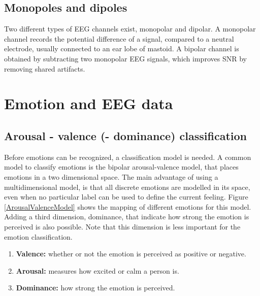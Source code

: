 
\subsection{Monopoles and dipoles}
Two different types of EEG channels exist, monopolar and dipolar. A monopolar channel records the potential difference of a signal, compared to a neutral electrode, usually connected to an ear lobe of mastoid. A bipolar channel is obtained by subtracting two monopolar EEG signals, which improves SNR by removing shared artifacts\cite{MonoBiPolar}. 

\section{Emotion and EEG data}

\subsection{Arousal - valence (- dominance) classification}
Before emotions can be recognized, a classification model is needed. A common model to classify emotions is the bipolar arousal-valence model\cite{ExtendedPaper}\cite{RealTimeEEGEmotion}, that places emotions in a two dimensional space. The main advantage of using a multidimensional model, is that all discrete emotions are modelled in its space, even when no particular label can be used to define the current feeling. Figure \ref{ArousalValenceModel} shows the mapping of different emotions for this model. Adding a third dimension, dominance, that indicate how strong the emotion is perceived is also possible\cite{EEGDatasets}. Note that this dimension is less important for the emotion classification.
\begin{enumerate}
\item \textbf{Valence:} whether or not the emotion is perceived as positive or negative.
\item \textbf{Arousal:} measures how excited or calm a person is.
\item \textbf{Dominance:} how strong the emotion is perceived.
\end{enumerate}


